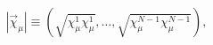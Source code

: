 \begin{equation}
\label{absv}
\left|\vec\chi_\mu\right|\equiv
\left(\sqrt{\chi_\mu^1\chi_\mu^1},\ldots,\sqrt{\chi_\mu^{N-1}\chi_\mu^{N-1}}\right),
\end{equation}

